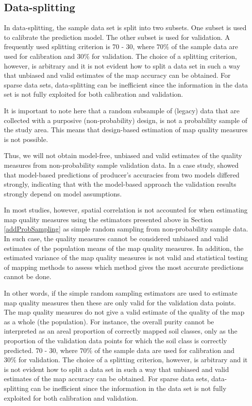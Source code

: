 \documentclass[10pt,b5paper,]{book}
\theoremstyle{definition}
\theoremstyle{definition}
\theoremstyle{definition}
\theoremstyle{remark}
\begin{document}
\hypertarget{data-splitting}{%
\subsection{Data-splitting}\label{data-splitting}}

In data-splitting, the sample data set is split into two subsets. One
subset is used to calibrate the prediction model. The other subset is
used for validation. A frequently used splitting criterion is 70 - 30,
where \(70\%\) of the sample data are used for calibration and \(30\%\)
for validation. The choice of a splitting criterion, however, is
arbitrary and it is not evident how to split a data set in such a way
that unbiased and valid estimates of the map accuracy can be obtained.
For sparse data sets, data-splitting can be inefficient since the
information in the data set is not fully exploited for both calibration
and validation.

It is important to note here that a random subsample of (legacy) data
that are collected with a purposive (non-probability) design, is not a
probability sample of the study area. This means that design-based
estimation of map quality measures is not possible.

Thus, we will not obtain model-free, unbiased and valid estimates of the
quality measures from non-probability sample validation data. In a case
study, \citet{knotters2013purposive} showed that model-based predictions
of producer's accuracies from two models differed strongly, indicating
that with the model-based approach the validation results strongly
depend on model assumptions.

In most studies, however, spatial correlation is not accounted for when
estimating map quality measures using the estimators presented above in
Section \ref{addProbSampling} as simple random sampling from
non-probability sample data. In such case, the quality measures cannot
be considered unbiased and valid estimates of the population means of
the map quality measures. In addition, the estimated variance of the map
quality measures is not valid and statistical testing of mapping methods
to assess which method gives the most accurate predictions cannot be
done.

In other words, if the simple random sampling estimators are used to
estimate map quality measures then these are only valid for the
validation data points. The map quality measures do not give a valid
estimate of the quality of the map as a whole (the population). For
instance, the overall purity cannot be interpreted as an areal
proportion of correctly mapped soil classes, only as the proportion of
the validation data points for which the soil class is correctly
predicted. 70 - 30, where \(70\%\) of the sample data are used for
calibration and \(30\%\) for validation. The choice of a splitting
criterion, however, is arbitrary and it is not evident how to split a
data set in such a way that unbiased and valid estimates of the map
accuracy can be obtained. For sparse data sets, data-splitting can be
inefficient since the information in the data set is not fully exploited
for both calibration and validation.
\end{document}
